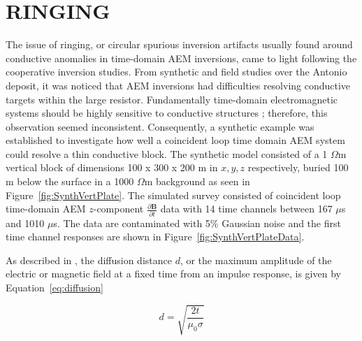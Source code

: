 \documentclass[letterpaper,11pt]{article}
\newcommand{\om}{{$\Omega$m }}
\begin{document}
\section{RINGING}
The issue of ringing, or circular spurious inversion artifacts usually found around conductive anomalies in time-domain AEM inversions, came to light following the cooperative inversion studies.  From synthetic and field studies over the Antonio deposit, it was noticed that AEM inversions had difficulties resolving conductive targets within the large resistor. Fundamentally time-domain electromagnetic systems should be highly sensitive to conductive structures \cite[]{Nabighian1988,Macnae1998}; therefore, this observation seemed inconsistent. Consequently, a synthetic example was established to investigate how well a coincident loop time domain AEM system could resolve a thin conductive block. The synthetic model consisted of a 1 \om vertical block of dimensions 100 x 300 x 200 m in $ \mathit{x,y,z} $ respectively, buried 100 m below the surface in a 1000 \om background as seen in Figure~\ref{fig:SynthVertPlate}.  The simulated survey consisted of coincident loop time-domain AEM $z$-component $ \frac{\partial\mathbf{B}}{\partial t} $ data with 14 time channels between 167 $ \mu $s and 1010 $ \mu $s. The data are contaminated with 5\% Gaussian noise and the first time channel responses are shown in Figure~\ref{fig:SynthVertPlateData}. 

As described in \cite{Ward1988}, the diffusion distance $ d $, or the maximum amplitude of the electric or magnetic field at a fixed time from an impulse response, is given by Equation~\ref{eq:diffusion}

\begin{equation}
d = \sqrt{\frac{2t}{\mu_0 \sigma}}
\label{eq:diffusion}
\end{equation}
\end{document}
